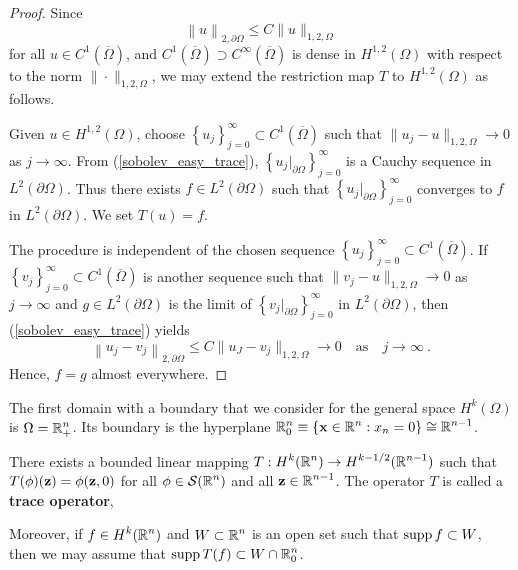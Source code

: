 \begin{proof}
Since 
\begin{equation} \label{sobolev_easy_trace}
\left\| u \right\|_{2,\partial \Omega}
\leq C \| u\|_{1,2,\Omega}
\end{equation}
for all $\displaystyle u \in C^1(\overline{\Omega})$, 
and $\displaystyle C^1(\overline{\Omega}) \supset C^\infty(\overline{\Omega})$
is dense in $\displaystyle H^{1,2}(\Omega)$ with
respect to the norm $\|\cdot\|_{1,2,\Omega}$, we may
extend the restriction map $T$ to $\displaystyle H^{1,2}(\Omega)$ as follows.

Given $\displaystyle u\in H^{1,2}(\Omega)$, choose
$\displaystyle \left\{ u_j\right\}_{j=0}^\infty
\subset C^1(\overline{\Omega})$ such that
$\|u_j - u\|_{1,2,\Omega} \rightarrow 0$ as $j\rightarrow \infty$.
From (\ref{sobolev_easy_trace}),
$\displaystyle \left\{ u_j\big|_{\partial \Omega} \right\}_{j=0}^\infty$ is a
Cauchy sequence in $\displaystyle L^2(\partial \Omega)$.  Thus there exists
$\displaystyle f \in L^2(\partial \Omega)$ such
that $\displaystyle \left\{ u_j\big|_{\partial \Omega} \right\}_{j=0}^\infty$
converges to $f$ in $\displaystyle L^2(\partial \Omega)$.  We set $T(u) = f$.

The procedure is independent of the chosen sequence 
$\displaystyle \left\{ u_j\right\}_{j=0}^\infty \subset C^1(\overline{\Omega})$.
If
$\displaystyle \left\{ v_j\right\}_{j=0}^\infty \subset C^1(\overline{\Omega})$
is another sequence such that
$\|v_j - u\|_{1,2,\Omega} \rightarrow 0$ as $j\rightarrow \infty$ and
$\displaystyle g \in L^2(\partial \Omega)$ is the limit of
$\displaystyle \left\{ v_j\big|_{\partial \Omega} \right\}_{j=0}^\infty$ in
$\displaystyle L^2(\partial \Omega)$, then (\ref{sobolev_easy_trace}) yields
\[
\left\| u_j - v_j \right\|_{2,\partial \Omega}
\leq C \| u_J - v_j\|_{1,2,\Omega} \rightarrow 0 \quad \text{as} \quad 
j\rightarrow \infty \ .
\]
Hence, $f=g$ almost everywhere.
\end{proof}

The first domain with a boundary that we consider for the general space
$\displaystyle H^k(\Omega)$ is $\displaystyle \Omega = \mathbb{R}^n_+$.
Its boundary is the hyperplane
$\displaystyle \mathbb{R}^n_0 \equiv \{ \mathbf{x}\in \mathbb{R}^n : x_n = 0 \} \cong \mathbb{R}^{n-1}$.

\begin{prop} \label{TraceRnRnp}
There exists a bounded linear mapping
$\displaystyle T:H^k(\mathbb{R}^n) \rightarrow H^{k-1/2}(\mathbb{R}^{n-1})$
such that
$\displaystyle T(\phi)(\mathbf{z}) = \phi(\mathbf{z},0)$
for all $\displaystyle \phi\in\mathcal{S}(\mathbb{R}^n)$ and all
$\displaystyle \mathbf{z} \in \mathbb{R}^{n-1}$.
The operator $T$ is called a
{\bfseries trace operator},

Moreover, if $\displaystyle f \in H^k(\mathbb{R}^n)$ and
$\displaystyle W \subset \mathbb{R}^n$ is an open set
such that $\operatorname{supp} f \subset W$, then we may assume that
$\displaystyle \operatorname{supp} T(f) \subset W \cap \mathbb{R}^n_0$.
\end{prop}

